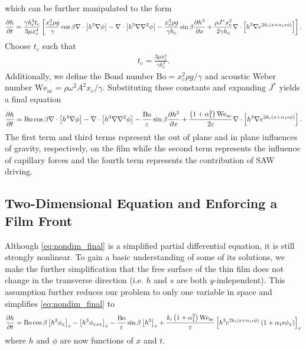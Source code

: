 which can be further manipulated to the form 
\begin{align*}
    \frac{\partial h}{\partial t} = \frac{\gamma h_c^3 t_c}{3\mu x_c^4} \left[ 
        \frac{x_c^2 \rho g}{\gamma} \cos \beta \nabla \cdot \left[ h^3\nabla\phi \right] - 
        \nabla \cdot \left[ h^3 \nabla \nabla^2 \phi \right] - 
        \frac{x_c^3 \rho g}{\gamma h_c} \sin\beta \frac{\partial h^3}{\partial x} + 
        \frac{\rho J^* x_c^2}{2 \gamma h_c} \nabla \cdot \left[ h^3 \nabla e^{2k_i \left( x + \alpha_1 \epsilon \phi \right)} \right]
     \right].
\end{align*}
Choose $t_c$ such that 
\begin{align*}
    t_c = \frac{3\mu x_c^4}{\gamma h_c^3}.
\end{align*}
Additionally, we define the Bond number $\mathrm{Bo} = x_c^2 \rho g / \gamma$ and acoustic Weber number
$\mathrm{We_{ac}} = \rho \omega^2 A^2 x_c / \gamma$. 
Substituting these constants and expanding $J^*$ yields a final equation
\begin{align}
    \frac{\partial h}{\partial t} = \mathrm{Bo} \cos\beta \nabla \cdot \left[  h^3 \nabla \phi  \right] - 
    \nabla \cdot \left[ h^3 \nabla\nabla^2\phi  \right] - 
    \frac{\mathrm{Bo}}{\varepsilon} \sin\beta \frac{\partial h^3}{\partial x} + 
    \frac{\left( 1 + \alpha_1^2 \right) \mathrm{We_{ac}}}{2\varepsilon} \nabla \cdot \left[ h^3 \nabla e^{2k_i \left( x + \alpha_1 \epsilon \phi \right)} \right]. 
    \label{eq:nondim_final}
\end{align}   
The first term and third terms represent the out of plane and in plane influences of gravity, respectively, on 
the film while the second term represents the influence of capillary forces and the fourth term represents the 
contribution of SAW driving.  

\subsection{Two-Dimensional Equation and Enforcing a Film Front}
Although \cref{eq:nondim_final} is a simplified partial differential equation, 
it is still strongly nonlinear. To gain a basic understanding of some of its solutions,
we make the further simplification that the free surface of the thin film does not change
in the transverse direction (i.e.\! $h$ and $s$ are both $y$-independent). This assumption
further reduces our problem to only one variable in space and simplifies \cref{eq:nondim_final} to 
\begin{align}
    \frac{\partial h}{\partial t} = \mathrm{Bo}\cos\beta \left[ h^3 \phi_x \right]_x - \left[ h^3 \phi_{xxx} \right]_{x} - \frac{\mathrm{Bo}}{\varepsilon} \sin\beta \left[ h^3 \right]_{x} + 
    \frac{k_i \left( 1 + \alpha_1^2 \right)\mathrm{We_{ac}}}{\varepsilon} \left[ h^3 e^{2k_i \left( x + \alpha_1 \epsilon \phi \right)} \left( 1 + \alpha_1 \epsilon \phi_x \right) \right]_x
    \label{eq:two_dim_final}
\end{align}
where $h$ and $\phi$ are now functions of $x$ and $t$.

